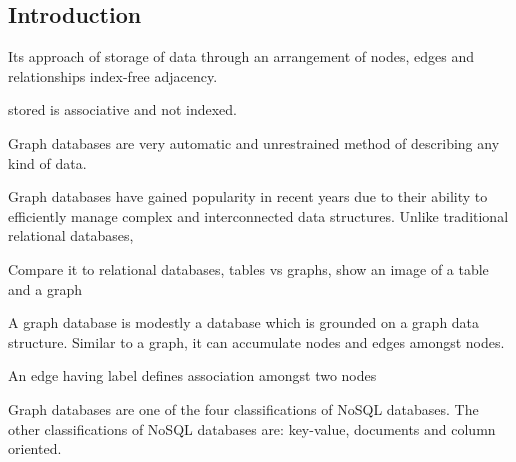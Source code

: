 

\subsection{Introduction}


Its approach of storage of data through an arrangement of nodes, edges and relationships
index-free adjacency. 

stored is associative and not indexed.


Graph databases are very automatic and unrestrained method of describing any kind of data. 

Graph databases have gained popularity in recent years due to their ability to efficiently manage complex and interconnected data structures. Unlike traditional relational databases, 


Compare it to relational databases, tables vs graphs, show an image of a table and a graph


A graph database is modestly a database which is grounded on a graph data structure. 
Similar to a graph, it can accumulate nodes and edges amongst nodes. 

An edge having label defines association amongst two nodes

Graph databases are one of the four classifications of NoSQL databases. 
The other classifications of NoSQL databases are: key-value, documents and column oriented.









